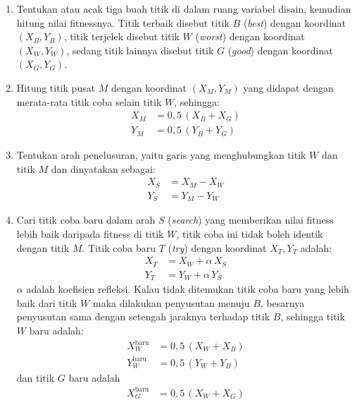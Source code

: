 \begin{enumerate}[label=\arabic*.]
\item Tentukan atau acak tiga buah titik di dalam ruang variabel disain,
      kemudian hitung nilai fitnessnya. Titik terbaik disebut titik $B$
      (\textit{best}) dengan koordinat $(X_B,Y_B)$, titik terjelek
      disebut titik $W$ (\textit{worst}) dengan koordinat $(X_W,Y_W)$,
      sedang titik lainnya disebut titik $G$ (\textit{good}) dengan
      koordinat $(X_G,Y_G)$.
\item Hitung titik pusat $M$ dengan koordinat $(X_M,Y_M)$ yang didapat
      dengan merata-rata titik coba selain titik $W$, sehingga:
      \begin{align}
      X_M &= 0{,}5\,(X_B + X_G) \label{eq:2-26}\\
      Y_M &= 0{,}5\,(Y_B + Y_G) \label{eq:2-27}
      \end{align}
\item Tentukan arah penelusuran, yaitu garis yang menghubungkan titik $W$
      dan titik $M$ dan dinyatakan sebagai:
      \begin{align}
      X_S &= X_M - X_W \label{eq:2-28}\\
      Y_S &= Y_M - Y_W \label{eq:2-29}
      \end{align}
\item Cari titik coba baru dalam arah $S$ (\textit{search}) yang
      memberikan nilai fitness lebih baik daripada fitness di titik $W$,
      titik coba ini tidak boleh identik dengan titik $M$. Titik coba
      baru $T$ (\textit{try}) dengan koordinat $X_T,Y_T$ adalah:
      \begin{align}
      X_T &= X_W + \alpha\,X_S \label{eq:2-30}\\
      Y_T &= Y_W + \alpha\,Y_S \label{eq:2-31}
      \end{align}
      $\alpha$ adalah koefisien refleksi. Kalau tidak ditemukan titik
      coba baru yang lebih baik dari titik $W$ maka dilakukan penyusutan
      menuju $B$, besarnya penyusutan sama dengan setengah jaraknya
      terhadap titik $B$, sehingga titik $W$ baru adalah:
      \begin{align}
      X_W^{\text{baru}} &= 0{,}5\,(X_W + X_B) \label{eq:2-32}\\
      Y_W^{\text{baru}} &= 0{,}5\,(Y_W + Y_B) \label{eq:2-33}
      \end{align}
      dan titik $G$ baru adalah
      \begin{align}
      X_G^{\text{baru}} &= 0{,}5\,(X_W + X_G) \label{eq:2-34}\\

\end{align}
\end{enumerate}
